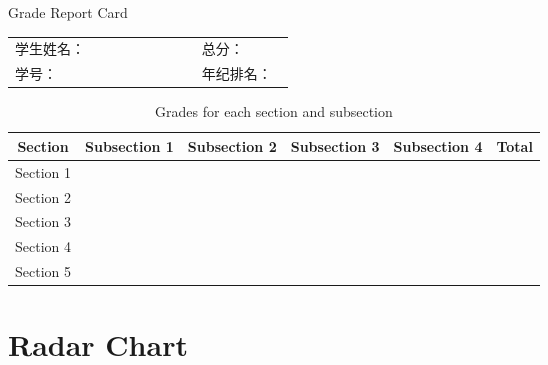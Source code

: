 \documentclass{article}
\begin{document}
\Large{Grade Report Card}
\begin{CJK*}{UTF8}{gbsn}

\begin{tabular}{p{0.6\linewidth}>{\raggedleft\arraybackslash}p{0.3\linewidth}}
 
学生姓名： &  总分：\\

学号：& 年纪排名：\\
\end{tabular}

\begin{table}[ht]
    \centering
    \begin{tabular}{|c|c|c|c|c|c|}
        \hline
        \textbf{Section} & \textbf{Subsection 1} & \textbf{Subsection 2} & \textbf{Subsection 3} & \textbf{Subsection 4} & \textbf{Total} \\
        \hline
        Section 1 & \hspace{1cm} & \hspace{1cm} & \hspace{1cm} & \hspace{1cm} & \hspace{1cm} \\
        \hline
        Section 2 & \hspace{1cm} & \hspace{1cm} & \hspace{1cm} & \hspace{1cm} & \hspace{1cm} \\
        \hline
        Section 3 & \hspace{1cm} & \hspace{1cm} & \hspace{1cm} & \hspace{1cm} & \hspace{1cm} \\
        \hline
        Section 4 & \hspace{1cm} & \hspace{1cm} & \hspace{1cm} & \hspace{1cm} & \hspace{1cm} \\
        \hline
        Section 5 & \hspace{1cm} & \hspace{1cm} & \hspace{1cm} & \hspace{1cm} & \hspace{1cm} \\
        \hline
    \end{tabular}
    \caption{Grades for each section and subsection}
    \label{tab:grades}
\end{table}

\vspace{1cm}

\section*{Radar Chart}
\begin{center}

\end{center}
\end{CJK*}
\end{document}
